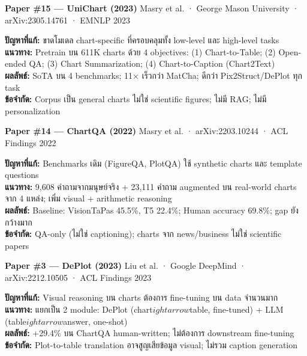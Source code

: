 \documentclass[10pt,a4paper]{article}
\begin{document}
\vspace{6pt}
\textbf{Paper \#15 — UniChart (2023)}
\hfill {\color{muted}\small Masry et al. · George Mason University · arXiv:2305.14761 · EMNLP 2023}

\begin{infobox}
\textbf{ปัญหาที่แก้:} ขาดโมเดล chart-specific ที่ครอบคลุมทั้ง low-level และ high-level tasks\\
\textbf{แนวทาง:} Pretrain บน 611K charts ด้วย 4 objectives: (1) Chart-to-Table; (2) Open-ended QA; (3) Chart Summarization; (4) Chart-to-Caption (Chart2Text)\\
\textbf{ผลลัพธ์:} SoTA บน 4 benchmarks; 11× เร็วกว่า MatCha; ดีกว่า Pix2Struct/DePlot ทุก task\\
\textbf{ข้อจำกัด:} Corpus เป็น general charts ไม่ใช่ scientific figures; ไม่มี RAG; ไม่มี personalization
\end{infobox}

\vspace{6pt}
\textbf{Paper \#14 — ChartQA (2022)}
\hfill {\color{muted}\small Masry et al. · arXiv:2203.10244 · ACL Findings 2022}

\begin{infobox}
\textbf{ปัญหาที่แก้:} Benchmarks เดิม (FigureQA, PlotQA) ใช้ synthetic charts และ template questions\\
\textbf{แนวทาง:} 9,608 คำถามจากมนุษย์จริง + 23,111 คำถาม augmented บน real-world charts จาก 4 แหล่ง; เพิ่ม visual + arithmetic reasoning\\
\textbf{ผลลัพธ์:} Baseline: VisionTaPas 45.5\%, T5 22.4\%; Human accuracy 69.8\%; gap ยังกว้างมาก\\
\textbf{ข้อจำกัด:} QA-only (ไม่ใช่ captioning); charts จาก news/business ไม่ใช่ scientific papers
\end{infobox}

\vspace{6pt}
\textbf{Paper \#3 — DePlot (2023)}
\hfill {\color{muted}\small Liu et al. · Google DeepMind · arXiv:2212.10505 · ACL Findings 2023}

\begin{infobox}
\textbf{ปัญหาที่แก้:} Visual reasoning บน charts ต้องการ fine-tuning บน data จำนวนมาก\\
\textbf{แนวทาง:} แยกเป็น 2 module: DePlot (chart$
ightarrow$table, fine-tuned) + LLM (table$
ightarrow$answer, one-shot)\\
\textbf{ผลลัพธ์:} +29.4\% บน ChartQA human-written; ไม่ต้องการ downstream fine-tuning\\
\textbf{ข้อจำกัด:} Plot-to-table translation อาจสูญเสียข้อมูล visual; ไม่รวม caption generation
\end{infobox}
\end{document}
